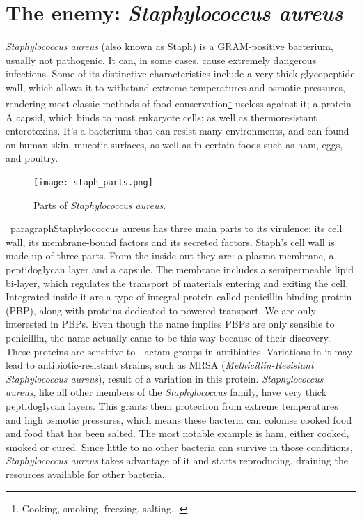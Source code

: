 \section{The enemy: \emph{Staphylococcus aureus}}
\paragraph{}\emph{Staphylococcus aureus} (also known as Staph) is a GRAM-positive bacterium, usually not pathogenic. It can, in some cases, cause extremely dangerous infections. Some of its distinctive characteristics include a very thick glycopeptide wall, which allows it to withstand extreme temperatures and osmotic pressures, rendering most classic methods of food conservation\footnote{Cooking, smoking, freezing, salting...} useless against it; a protein A capsid, which binds to most eukaryote cells; as well as thermoresistant enterotoxins. It's a bacterium that can resist many environments, and can found on human skin, mucotic surfaces, as well as in certain foods such as ham, eggs, and poultry\cite{nutritionBAMChapter122020}.\newpage
\begin{figure}\begin{center}\texttt{[image: staph\_parts.png]}\end{center}\caption{Parts of \emph{Staphylococcus aureus}\cite{kongCommunityAssociatedMethicillinResistantStaphylococcus2016}.}\end{figure}\
paragraph{}Staphylococcus aureus has three main parts to its virulence: its cell wall, its membrane-bound factors and its secreted factors. Staph's cell wall is made up of three parts. From the inside out they are: a plasma membrane, a peptidoglycan layer and a capsule\cite{kongCommunityAssociatedMethicillinResistantStaphylococcus2016}.
The membrane includes a semipermeable lipid bi-layer, which regulates the transport of materials entering and exiting the cell. Integrated inside it are a type of integral protein called penicillin-binding protein (PBP), along with proteins dedicated to powered transport. We are only interested in PBPs. Even though the name implies PBPs are only sensible to penicillin, the name actually came to be this way because of their discovery. These proteins are sensitive to \beta-lactam groups in antibiotics. Variations in it may lead to antibiotic-resistant strains, such as MRSA (\emph{Methicillin-Resistant \emph{Staphylococcus aureus}}), result of a variation in this protein\cite{kongTargetingStaphylococcusAureus2016}. \newline
\emph{Staphylococcus aureus}, like all other members of the \emph{Staphylococcus} family, have very thick peptidoglycan layers. This grants them protection from extreme temperatures and high osmotic pressures, which means these bacteria can colonise cooked food and food that has been salted. The most notable example is ham, either cooked, smoked or cured. Since little to no other bacteria can survive in those conditions, \emph{Staphylococcus aureus} takes advantage of it and starts reproducing, draining the resources available for other bacteria.
